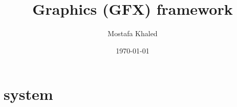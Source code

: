 \documentclass{book}
\title{Graphics (GFX) framework}
\author{Mostafa Khaled}
\date{\today}
\begin{document}
  \maketitle
  \pagebreak
  \tableofcontents

  

  \chapter{system}
  
  
  
  
  
  
  
\end{document}

